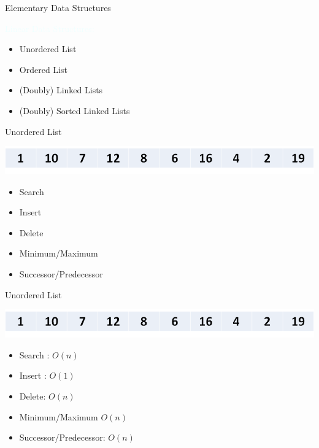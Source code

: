 \documentclass{beamer}
\newcommand{\tblue}[1]{{\Large {\textcolor{azure}{#1}}}}
\begin{document}
\begin{frame}{Elementary Data Structures}

\tblue{Linear Data Structures:}
\begin{itemize}
\item Unordered List 
\item Ordered List 
\item (Doubly) Linked Lists
\item (Doubly) Sorted Linked Lists
\end{itemize}
\end{frame}


\begin{frame}{Unordered List}
\begin{center}
    \includegraphics[scale=0.4]{list.png}
\end{center}
\begin{itemize}
    \item Search
    \item Insert
    \item Delete
    \item Minimum/Maximum
    \item Successor/Predecessor
\end{itemize}
\end{frame}


\begin{frame}{Unordered List}
\begin{center}
    \includegraphics[scale=0.4]{list.png}
\end{center}
\begin{itemize}
    \item Search : $O(n)$
    \item Insert : $O(1)$ 
    \item Delete: $O(n)$
    \item Minimum/Maximum $O(n)$
    \item Successor/Predecessor: $O(n)$
\end{itemize}
\end{frame}
\end{document}

